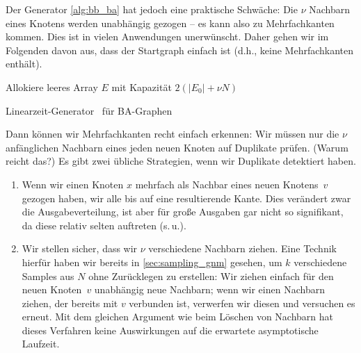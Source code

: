 Der Generator \cref{alg:bb_ba} hat jedoch eine praktische Schwäche:
Die $\nu$ Nachbarn eines Knotens werden unabhängig gezogen -- es kann also zu Mehrfachkanten kommen.
Dies ist in vielen Anwendungen unerwünscht.
Daher gehen wir im Folgenden davon aus, dass der Startgraph einfach ist (d.h., keine Mehrfachkanten enthält).

\begin{algorithm}[t]

	Allokiere leeres Array $E$ mit Kapazität $2(|E_0| + \nu N)$\;

	\caption{Linearzeit-Generator~\cite{batagelj2005efficient} für BA-Graphen}
	\label{alg:bb_ba}
\end{algorithm}

Dann können wir Mehrfachkanten recht einfach erkennen:
Wir müssen nur die $\nu$ anfänglichen Nachbarn eines jeden neuen Knoten auf Duplikate prüfen.
(Warum reicht das?)
Es gibt zwei übliche Strategien, wenn wir Duplikate detektiert haben.

\begin{enumerate}
    \item Wenn wir einen Knoten $x$ mehrfach als Nachbar eines neuen Knotens~$v$ gezogen haben,  wir alle bis auf eine resultierende Kante.
          Dies verändert zwar die Ausgabeverteilung, ist aber für große Ausgaben gar nicht so signifikant, da diese relativ selten auftreten (s.\,u.).

    \item Wir stellen sicher, dass wir $\nu$ verschiedene Nachbarn ziehen.
          Eine Technik hierfür haben wir bereits in \cref{sec:sampling_gnm} gesehen, um $k$ verschiedene Samples aus $N$ ohne Zurücklegen zu erstellen:
          Wir ziehen einfach für den neuen Knoten~$v$ unabhängig neue Nachbarn;
          wenn wir einen Nachbarn ziehen, der bereits mit $v$ verbunden ist, verwerfen wir diesen und versuchen es erneut.
          Mit dem gleichen Argument wie beim Löschen von Nachbarn hat dieses Verfahren keine Auswirkungen auf die erwartete asymptotische Laufzeit.

\end{enumerate}

